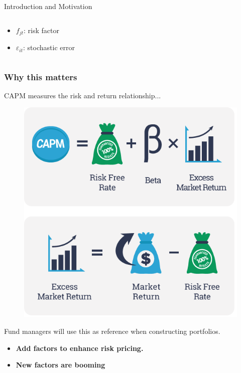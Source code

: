 \documentclass[12pt]{beamer}
\begin{document}
\begin{frame}{Introduction and Motivation}
\begin{columns}
\begin{column}{0.5\textwidth}
\begin{center}
\begin{itemize}
\item $f_{jt}$: risk factor
\item $\varepsilon_{it}$: stochastic error
\end{itemize}
		\end{center}
	\end{column}
\end{columns}
\end{frame}

\begin{frame}
\frametitle{Why this matters}
CAPM measures the risk and return relationship...\\
\begin{figure}
\includegraphics[scale = 0.2]{figure/CAPM.png}
\end{figure}
Fund managers will use this as reference when constructing portfolios.\\
\begin{itemize}
	\item{\bf Add factors to enhance risk pricing.}
	\item{\bf  New factors are booming }
\end{itemize}
\end{frame}
\end{document}
